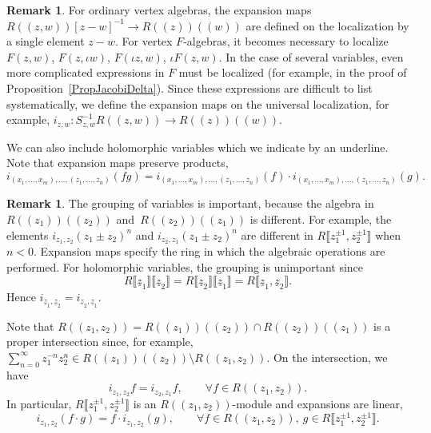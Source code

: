 \documentclass[pdftex]{sigma}
\numberwithin{equation}{section}
\theoremstyle{definition}
\newtheorem{Remark}[Theorem]{Remark}
\def\lb{\llbracket}
\def\rb{\rrbracket}
\begin{document}
\begin{Remark}
For ordinary vertex algebras, the expansion maps $R(\!( z,w)\!)[z-w]^{-1}\to R(\!( z)\!)(\!( w)\!)$ are defined on the localization by a single element $z-w$. For vertex $F$-algebras, it becomes necessary to localize $F(z,w)$, $F(z,\iota w)$, $F(\iota z,w)$, $\iota F(z,w)$. In the case of several variables, even more complicated expressions in $F$ must be localized (for example, in the proof of Proposition~\ref{PropJacobiDelta}). Since these expressions are difficult to list systematically, we define the expansion maps on the universal localization, for example, $i_{z,w}\colon S_{z,w}^{-1}R(\!( z,w)\!)\to R(\!( z)\!)(\!( w)\!)$.
\end{Remark}

We can also include holomorphic variables which we indicate by an underline. Note that expansion maps preserve products,
 \[
 i_{(x_1,\dots, x_m),\dots, (z_1,\dots, z_n)}(fg)
=i_{(x_1,\dots, x_m),\dots, (z_1,\dots, z_n)}(f)
\cdot i_{(x_1,\dots, x_m),\dots, (z_1,\dots, z_n)}(g).
 \]

\begin{Remark}
The grouping of variables is important, because the algebra in $R(\!( z_1)\!)(\!( z_2)\!)$ and~${R(\!( z_2)\!)(\!( z_1)\!)}$ is different. For example, the elements $i_{z_1,z_2}(z_1\pm z_2)^n$ and $i_{z_2,z_1}(z_1\pm z_2)^n$ are different in $R\big\lb z_1^{\pm1},z_2^{\pm1}\big\rb$ when $n<0$. Expansion maps specify the ring in which the algebraic operations are performed. For holomorphic variables, the grouping is unimportant since
\[
 R\lb\underline z_1\rb \lb\underline z_2\rb = R\lb\underline z_2\rb \lb\underline z_1\rb = R\lb\underline z_1,\underline z_2\rb.
\]
Hence $i_{\underline z_1,\underline z_2}=i_{\underline z_2,\underline z_1}$.
\end{Remark}

Note that $R(\!( z_1,z_2)\!)=R(\!( z_1)\!)(\!( z_2)\!)\cap R(\!( z_2)\!)(\!( z_1)\!)$ is a proper intersection since, for example, $\sum_{n=0}^\infty z_1^{-n}z_2^n\in R(\!( z_1)\!)(\!( z_2)\!)\setminus R(\!( z_1,z_2)\!)$. On the intersection, we have
\begin{equation}\label{swap-expansion}
 i_{z_1,z_2}f=i_{z_2,z_1}f,\qquad\forall f\in R(\!( z_1,z_2)\!).
\end{equation}
In particular, $R\big\lb z_1^{\pm1},z_2^{\pm1}\big\rb$ is an $R(\!( z_1,z_2)\!)$-module and expansions are linear,
\begin{equation}
\label{PowerSeriesLinearity}
 i_{z_1,z_2}(f\cdot g)=f\cdot i_{z_1,z_2}(g),\qquad \forall f\in R(\!( z_1,z_2)\!), \ g\in R\big\lb z_1^{\pm1},z_2^{\pm1}\big\rb.
\end{equation}
\end{document}

